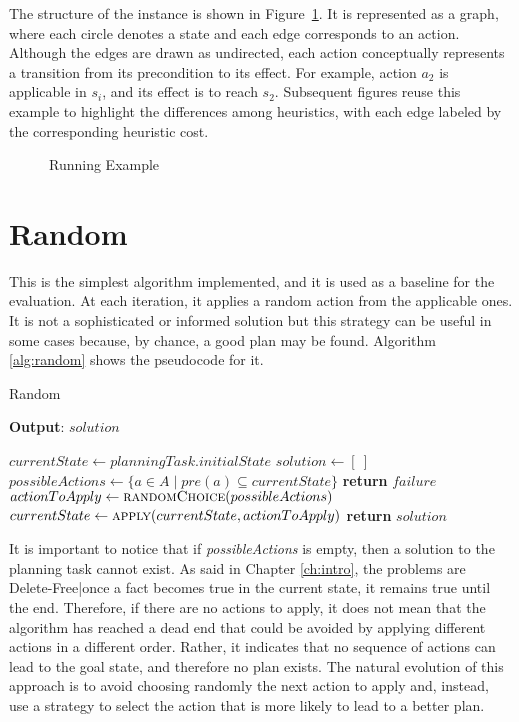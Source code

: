 The structure of the instance is shown in Figure~\ref{fig:running_example}.
It is represented as a graph, where each circle denotes a state and each edge corresponds to an action.
Although the edges are drawn as undirected, each action conceptually represents a transition from its precondition to its effect.
For example, action $a_2$ is applicable in $s_i$, and its effect is to reach $s_2$.
Subsequent figures reuse this example to highlight the differences among heuristics,
with each edge labeled by the corresponding heuristic cost.

\begin{figure}[ht]
	\centering
	\def\svgwidth{0.75\linewidth}
	
	\caption{Running Example}
	\label{fig:running_example}
\end{figure}

\section{Random}
This is the simplest algorithm implemented, and it is used as a baseline for the evaluation.
At each iteration, it applies a random action from the applicable ones.
It is not a sophisticated or informed solution but this strategy can be useful
in some cases because, by chance, a good plan may be found.
Algorithm \ref{alg:random} shows the pseudocode for it.

\begin{algorithm}
	\caption{Random}
	\label{alg:random}
	\hspace*{0.5em} \textbf{Output}: $solution$
	\begin{algorithmic}[1]
		\State $currentState \gets planningTask.initialState$
		\State $solution \gets [\ ]$ 
		\State $possibleActions \gets \{a \in A \mid pre(a) \subseteq currentState\}$
		\State \textbf{return} $failure$ 
		\EndIf
		\State $actionToApply \gets \Call{randomChoice}{possibleActions}$
		\State $currentState \gets \Call{apply}{currentState, actionToApply}$
		\State {}
		\EndWhile
		\State \textbf{return} $solution$
		\EndProcedure
	\end{algorithmic}
\end{algorithm}

It is important to notice that if \textit{possibleActions} is empty, then
a solution to the planning task cannot exist. As said in Chapter \ref{ch:intro},
the problems are Delete-Free|once a fact becomes true in the current state, it remains
true until the end.
Therefore, if there are no actions to apply, it does not mean that the algorithm has reached
a dead end that could be avoided by applying different actions in a different order.
Rather, it indicates that no sequence of actions can lead to the goal state, and therefore no plan exists.
The natural evolution of this approach is to avoid choosing randomly the next action to apply and, instead, use
a strategy to select the action that is more likely to lead to a better plan.

